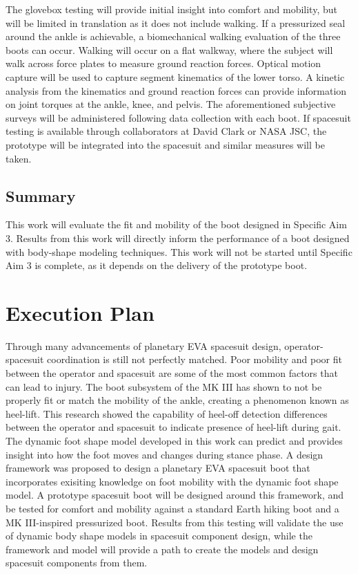 \documentclass[defaultstyle,11pt]{comps}
\begin{document}
The glovebox testing will provide initial insight into comfort and mobility, but will be limited in translation as it does not include walking.
If a pressurized seal around the ankle is achievable, a biomechanical walking evaluation of the three boots can occur.
Walking will occur on a flat walkway, where the subject will walk across force plates to measure ground reaction forces.
Optical motion capture will be used to capture segment kinematics of the lower torso.
A kinetic analysis from the kinematics and ground reaction forces can provide information on joint torques at the ankle, knee, and pelvis.
The aforementioned subjective surveys will be administered following data collection with each boot.
If spacesuit testing is available through collaborators at David Clark or NASA JSC, the prototype will be integrated into the spacesuit and similar measures will be taken.

\hypertarget{summary-4}{%
\section{Summary}\label{summary-4}}

This work will evaluate the fit and mobility of the boot designed in Specific Aim 3.
Results from this work will directly inform the performance of a boot designed with body-shape modeling techniques.
This work will not be started until Specific Aim 3 is complete, as it depends on the delivery of the prototype boot.

\hypertarget{execution-plan}{%
\chapter{Execution Plan}\label{execution-plan}}

Through many advancements of planetary EVA spacesuit design, operator-spacesuit coordination is still not perfectly matched.
Poor mobility and poor fit between the operator and spacesuit are some of the most common factors that can lead to injury.
The boot subsystem of the MK III has shown to not be properly fit or match the mobility of the ankle, creating a phenomenon known as heel-lift.
This research showed the capability of heel-off detection differences between the operator and spacesuit to indicate presence of heel-lift during gait.
The dynamic foot shape model developed in this work can predict and provides insight into how the foot moves and changes during stance phase.
A design framework was proposed to design a planetary EVA spacesuit boot that incorporates exisiting knowledge on foot mobility with the dynamic foot shape model.
A prototype spacesuit boot will be designed around this framework, and be tested for comfort and mobility against a standard Earth hiking boot and a MK III-inspired pressurized boot.
Results from this testing will validate the use of dynamic body shape models in spacesuit component design, while the framework and model will provide a path to create the models and design spacesuit components from them.
\end{document}
